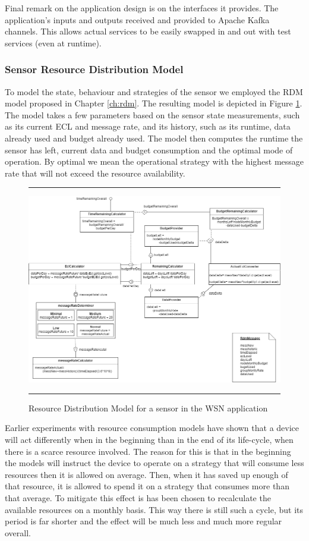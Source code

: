 Final remark on the application design is on the interfaces it provides. The application's inputs and outputs received and provided to Apache Kafka channels. This allows actual services to be easily swapped in and out with test services (even at runtime). 

\subsubsection{Sensor Resource Distribution Model}
To model the state, behaviour and strategies of the sensor we employed the RDM model proposed in Chapter \ref{ch:rdm}. The resulting model is depicted in Figure \ref{fig:sensit_rdm}. The model takes a few parameters based on the sensor state measurements, such as its current ECL and message rate, and its history, such as its runtime, data already used and budget already used. The model then computes the runtime the sensor has left, current data and budget consumption and the optimal mode of operation. By optimal we mean the operational strategy with the highest message rate that will not exceed the resource availability.

\begin{figure}
\centering
\hrule
\includegraphics[width=\textwidth]{resources/img/sensit_rdm.png}
\hrule
\caption{Resource Distribution Model for a sensor in the \idsystems \sensit WSN application}
\label{fig:sensit_rdm}
\end{figure}

Earlier experiments with resource consumption models have shown that a device will act differently when in the beginning than in the end of its life-cycle, when there is a scarce resource involved. The reason for this is that in the beginning the models will instruct the device to operate on a strategy that will consume less resources then it is allowed on average. Then, when it has saved up enough of that resource, it is allowed to spend it on a strategy that consumes more than that average. To mitigate this effect is has been chosen to recalculate the available resources on a monthly basis. This way there is still such a cycle, but its period is far shorter and the effect will be much less and much more regular overall.

